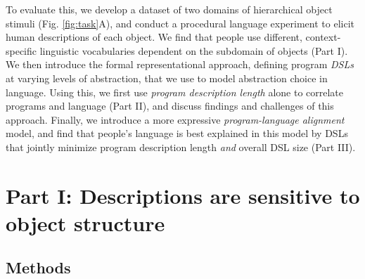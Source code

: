 \documentclass[10pt,letterpaper]{article}
\begin{document}
To evaluate this, we develop a dataset of two domains of hierarchical object stimuli (Fig. \ref{fig:task}A), and conduct a procedural language experiment to elicit human descriptions of each object. We find that people use different, context-specific linguistic vocabularies dependent on the subdomain of objects (Part I). We then introduce the formal representational approach, defining program \textit{DSLs} at varying levels of abstraction, that we use to model abstraction choice in language. Using this, we first use \textit{program description length} alone to correlate programs and language (Part II), and discuss findings and challenges of this approach. Finally, we introduce a more expressive \textit{program-language alignment} model, and find that people's language is best explained in this model by DSLs that jointly minimize program description length \textit{and} overall DSL size (Part III).

\section{Part I: Descriptions are sensitive to object structure} \label{sec-part-i}

% 




\subsection{Methods}
\end{document}
